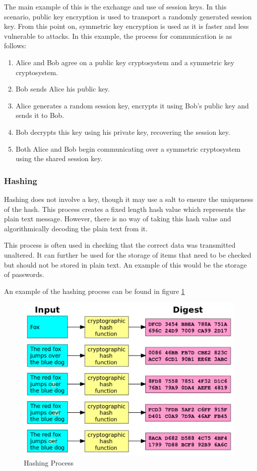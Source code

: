 				The main example of this is the exchange and use of session keys.
				In this scenario, public key encryption is used to transport a randomly generated session key.
				From this point on, symmetric key encryption is used as it is faster and less vulnerable to attacks.
				In this example, the process for communication is as follows:
				\begin{enumerate}
					\item Alice and Bob agree on a public key cryptosystem and a symmetric key cryptosystem.
					\item Bob sends Alice his public key.
					\item Alice generates a random session key, encrypts it using Bob's public key and sends it to Bob.
					\item Bob decrypts this key using his private key, recovering the session key.
					\item Both Alice and Bob begin communicating over a symmetric cryptosystem using the shared session key.
				\end{enumerate}

			\subsubsection{Hashing}
				Hashing does not involve a key, though it may use a salt to ensure the uniqueness of the hash.
				This process creates a fixed length hash value which represents the plain text message.
				However, there is no way of taking this hash value and algorithmically decoding the plain text from it.

				This process is often used in checking that the correct data was transmitted unaltered.
				It can further be used for the storage of items that need to be checked but should not be stored in plain text.
				An example of this would be the storage of passwords.

				An example of the hashing process can be found in figure \ref{fig:HashingProcess}
				\begin{figure}[htb]
					\centering
					\includegraphics[scale=0.25]{./HashProcess.png}
					\caption{Hashing Process}
					\label{fig:HashingProcess}
				\end{figure}

